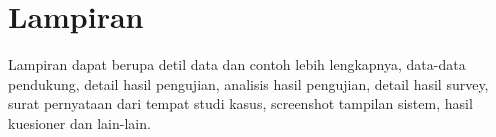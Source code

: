 


\section*{Lampiran}

\noindent Lampiran dapat berupa detil data dan contoh lebih lengkapnya, data-data pendukung, detail hasil pengujian, analisis hasil pengujian, detail hasil survey, surat pernyataan dari tempat studi kasus, screenshot tampilan sistem, hasil kuesioner dan lain-lain.
